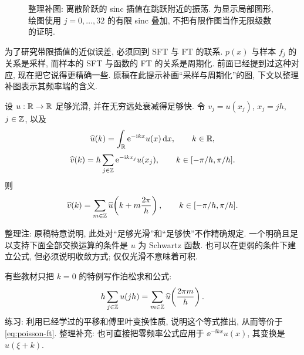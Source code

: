 \begin{figure}[htbp]
\caption{整理补图: 离散阶跃的 sinc 插值在跳跃附近的振荡. 为显示局部图形, 绘图使用 $j=0,\ldots,32$ 的有限 sinc 叠加, 不把有限作图当作无限级数的证明.}
\end{figure}

为了研究带限插值的近似误差, 必须回到 SFT 与 FT 的联系. $p(x)$ 与样本 $f_j$ 的关系是采样, 而样本的 SFT 与函数的 FT 的关系是周期化. 前面已经提到过这种对应, 现在把它说得更精确一些. 原稿在此提示补画“采样与周期化”的图, 下文以整理补图表示其频率端的含义.

\begin{theorem}\label{thm:poisson-ft}
设 $u:\mathbb R\to\mathbb R$ 足够光滑, 并在无穷远处衰减得足够快. 令 $v_j=u(x_j)$, $x_j=jh$, $j\in\mathbb Z$, 以及
\[
\widehat u(k)=\int_{\mathbb R}\mathrm e^{-\mathrm i kx}u(x)\,\mathrm d x,
\qquad k\in\mathbb R,
\]
\[
\widehat v(k)=h\sum_{j\in\mathbb Z}\mathrm e^{-\mathrm i kx_j}u(x_j),
\qquad k\in[-\pi/h,\pi/h].
\]
则
\begin{equation}\label{eq:poisson-ft}
\widehat v(k)=\sum_{m\in\mathbb Z}
\widehat u\!\left(k+m\frac{2\pi}h\right),
\qquad k\in[-\pi/h,\pi/h].
\end{equation}
\end{theorem}
\begin{remark}
整理注: 原稿特意说明, 此处对“足够光滑”和“足够快”不作精确规定. 一个明确且足以支持下面全部交换运算的条件是 $u$ 为 Schwartz 函数. 也可以在更弱的条件下建立公式, 但必须说明收敛方式; 仅仅光滑不意味着可积.
\end{remark}

有些教材只把 $k=0$ 的特例写作泊松求和公式:
\[
h\sum_{j\in\mathbb Z}u(jh)=\sum_{m\in\mathbb Z}\widehat u\!\left(\frac{2\pi m}h\right).
\]
练习: 利用已经学过的平移和傅里叶变换性质, 说明这个等式推出, 从而等价于 \eqref{eq:poisson-ft}. 整理补充: 也可直接把零频率公式应用于 $\ee^{-\ii kx}u(x)$, 其变换是 $\widehat u(\xi+k)$.


